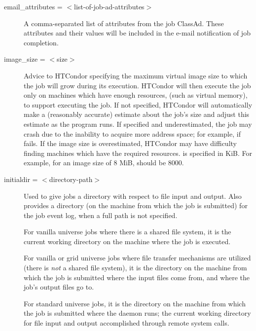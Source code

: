 \begin{description}

\label{condor-submit-email-attributes}
\item[email\_attributes = $<$list-of-job-ad-attributes$>$] 
A comma-separated list of attributes from the job ClassAd. These
attributes and their values will be included in the e-mail notification
of job completion.


\label{condor-submit-image-size}
\item[image\_size = $<$size$>$] Advice to HTCondor specifying the maximum
virtual image size to which the job will grow during its execution.
HTCondor will then execute the job only on machines which have enough resources,
(such as virtual memory), to support executing the job.
If not specified, HTCondor will automatically make a (reasonably accurate)
estimate about the job's size and adjust this estimate as the program runs.
If specified and underestimated, the job may crash due to
the inability to acquire more address space; 
for example, if  fails. 
If the image size is overestimated,
HTCondor may have difficulty finding machines which have the required resources.
 is specified in KiB. 
For example, for an image size of 8 MiB,  should be 8000.


\label{man-condor-submit-initialdir}
\item[initialdir = $<$directory-path$>$] 
Used to give jobs a directory with respect to file input and output.
Also provides a directory 
(on the machine from which the job is submitted)
for the job event log, when a full path is not specified. 

For vanilla universe jobs where there is a shared file system,
it is the current working directory on the machine where the
job is executed.

For vanilla or grid universe jobs where file transfer mechanisms are
utilized (there is \emph{not} a shared file system),
it is the directory on the machine from which the job is submitted
where the input files come from, and where the job's output
files go to.

For standard universe jobs,
it is the directory on the machine from which the job is submitted
where the  daemon runs;
the current working directory for file input and output accomplished
through remote system calls.


\end{description}
